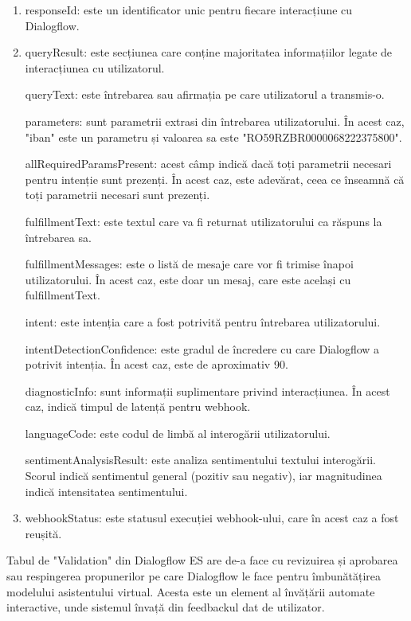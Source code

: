 \begin{enumerate}
    \item responseId: este un identificator unic pentru fiecare interacțiune cu Dialogflow.

    \item queryResult: este secțiunea care conține majoritatea informațiilor legate de interacțiunea cu utilizatorul.
    
    \subitem queryText: este întrebarea sau afirmația pe care utilizatorul a transmis-o.
    
    \subitem parameters: sunt parametrii extrasi din întrebarea utilizatorului. În acest caz, "iban" este un parametru și valoarea sa este "RO59RZBR0000068222375800".
    
    \subitem allRequiredParamsPresent: acest câmp indică dacă toți parametrii necesari pentru intenție sunt prezenți. În acest caz, este adevărat, ceea ce înseamnă că toți parametrii necesari sunt prezenți.
    
    \subitem fulfillmentText: este textul care va fi returnat utilizatorului ca răspuns la întrebarea sa.
    
    \subitem fulfillmentMessages: este o listă de mesaje care vor fi trimise înapoi utilizatorului. În acest caz, este doar un mesaj, care este același cu fulfillmentText.
    
    \subitem intent: este intenția care a fost potrivită pentru întrebarea utilizatorului.
    
    \subitem intentDetectionConfidence: este gradul de încredere cu care Dialogflow a potrivit intenția. În acest caz, este de aproximativ 90.
    
    \subitem diagnosticInfo: sunt informații suplimentare privind interacțiunea. În acest caz, indică timpul de latență pentru webhook.
    
    \subitem languageCode: este codul de limbă al interogării utilizatorului.
    
    \subitem sentimentAnalysisResult: este analiza sentimentului textului interogării. Scorul indică sentimentul general (pozitiv sau negativ), iar magnitudinea indică intensitatea sentimentului.
    
    \item webhookStatus: este statusul execuției webhook-ului, care în acest caz a fost reușită.
\end{enumerate}

Tabul de "Validation" din Dialogflow ES are de-a face cu revizuirea și aprobarea sau respingerea propunerilor pe care Dialogflow le face pentru îmbunătățirea modelului asistentului virtual. Acesta este un element al învățării automate interactive, unde sistemul învață din feedbackul dat de utilizator.

